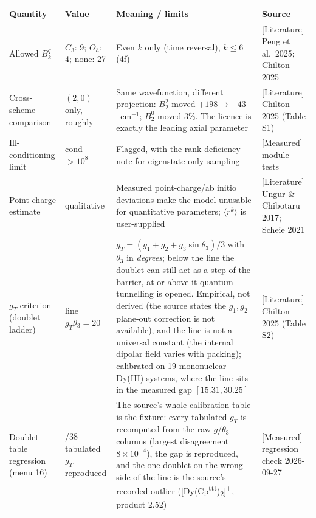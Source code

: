 \begin{center}
\begin{tabularx}{\textwidth}{@{}>{\raggedright\arraybackslash}p{3.2cm} >{\raggedright\arraybackslash}p{2.0cm} X >{\raggedright\arraybackslash}p{3.2cm}@{}}
\toprule
Quantity & Value & Meaning / limits & Source \\
\midrule
Allowed $B_k^q$ & $C_3$: 9; $O_h$: 4; none: 27 & Even $k$ only (time reversal),
  $k \le 6$ (4f) & \textsf{[Literature]} Peng et al.\ 2025; Chilton 2025 \\
Cross-scheme comparison & $(2,0)$ only, roughly & Same wavefunction, different
  projection: $B_2^2$ moved $+198 \to -43$~cm$^{-1}$; $B_2^0$ moved 3\%. The
  licence is exactly the leading axial parameter & \textsf{[Literature]}
  Chilton 2025 (Table S1) \\
Ill-conditioning limit & cond $> 10^8$ & Flagged, with the rank-deficiency note
  for eigenstate-only sampling & \textsf{[Measured]} module tests \\
Point-charge estimate & qualitative & Measured point-charge/ab initio
  deviations make the model unusable for quantitative parameters; $\langle
  r^k\rangle$ is user-supplied & \textsf{[Literature]} Ungur \& Chibotaru 2017;
  Scheie 2021 \\
$g_T$ criterion (doublet ladder) & line $g_T\theta_3 = 20$ &
  $g_T = (g_1 + g_2 + g_3 \sin\theta_3) / 3$ with $\theta_3$ in
  \emph{degrees}; below the line the doublet can still act as a step of the
  barrier, at or above it quantum tunnelling is opened. Empirical, not derived
  (the source states the $g_1,g_2$ plane-out correction is not available), and
  the line is not a universal constant (the internal dipolar field varies with
  packing); calibrated on 19 mononuclear Dy(III) systems, where the line sits in
  the measured gap $[15.31, 30.25]$ & \textsf{[Literature]} Chilton 2025
  (Table S2) \\
Doublet-table regression (menu 16) & 38/38 tabulated $g_T$ reproduced & The
  source's whole calibration table is the fixture: every tabulated $g_T$ is
  recomputed from the raw $g$/$ \theta_3$ columns (largest disagreement
  $8\times10^{-4}$), the gap is reproduced, and the one doublet on the wrong
  side of the line is the source's recorded outlier
  ([Dy(Cp\textsuperscript{ttt})\textsubscript{2}]\textsuperscript{+}, product
  2.52) & \textsf{[Measured]} regression check 2026-09-27 \\
\bottomrule
\end{tabularx}
\end{center}

